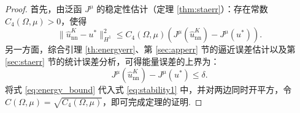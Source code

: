 \begin{proof}
首先，由泛函 $J^{\mu}$ 的稳定性估计（定理 \ref{thm:staerr}）：存在常数 $C_4(\Omega,\mu)>0$，使得
\begin{equation}\label{eq:stability1}
\|\widehat{u}_{\text{nn}}^K-u^*\|_{H^{1}}^2 \leq C_4(\Omega,\mu) \left( J^{\mu}(\widehat{u}_{\text{nn}}^K)-J^{\mu}(u^*) \right).
\end{equation}
另一方面，综合引理 \ref{th:energyerr}、第 \ref{sec:apperr} 节的逼近误差估计以及第 \ref{sec:staerr} 节的统计误差分析，可得能量误差的上界为：
\begin{equation}\label{eq:energy_bound}
J^{\mu}(\widehat{u}_{\text{nn}}^K)-J^{\mu}(u^*)\leq \delta.
\end{equation}
将式 \eqref{eq:energy_bound} 代入式 \eqref{eq:stability1} 中，并对两边同时开平方，令 $C(\Omega,\mu) = \sqrt{C_4(\Omega,\mu)}$，即可完成定理的证明.
\end{proof}

